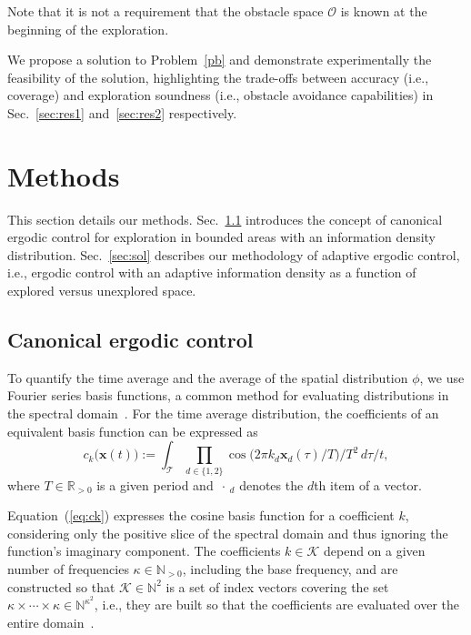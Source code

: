 \documentclass[letterpaper, 10 pt, conference, twoside]{IEEEtran}
\theoremstyle{definition}
\begin{document}
Note that it is not a requirement that the obstacle space $\mathcal{O}$ is known at the beginning of the exploration.

We propose a solution to Problem~\ref{pb} and demonstrate experimentally the feasibility of the solution, highlighting the trade-offs between accuracy (i.e., coverage) and exploration soundness (i.e., obstacle avoidance capabilities) in Sec.~\ref{sec:res1} and~\ref{sec:res2} respectively.


\section{Methods}\label{sec:meth}
\noindent
This section details our methods. Sec.~\ref{sec:canon} introduces the concept of canonical ergodic control for exploration in bounded areas with an information density distribution. Sec.~\ref{sec:sol} describes our methodology of adaptive ergodic control, i.e., ergodic control with an adaptive information density as a function of explored versus unexplored space.


\subsection{Canonical ergodic control}
\label{sec:canon}
\noindent
To quantify the time average and the average of the spatial distribution $\phi$, we use Fourier series basis functions, a common method for evaluating distributions in the spectral domain~\cite{mathew2011metrics}. For the time average distribution, the coefficients of an equivalent basis function can be expressed as
\begin{equation}\label{eq:ck}
  c_k\big(\mathbf{x}(t)\big):=\int_{\mathcal{T}}{\prod_{d\in\{1,2\}}}{\cos{\big(2\pi k_d\mathbf{x}_d(\tau)/T\big)}/T^2}\,d\tau/t,
\end{equation}
where $T\in\mathbb{R}_{>0}$ is a given period and $\,\cdot\,_d$ denotes the $d$th item of a vector.

Equation~(\ref{eq:ck}) expresses the cosine basis function for a coefficient $k$, considering only the positive slice of the spectral domain and thus ignoring the function's imaginary component. The coefficients $k\in\mathcal{K}$ depend on a given number of frequencies $\kappa\in\mathbb{N}_{>0}$, including the base frequency, and are constructed so that $\mathcal{K}\in\mathbb{N}^2$ is a set of index vectors covering the set $\kappa\times\cdots\times\kappa\in\mathbb{N}^{\kappa^2}$, i.e., they are built so that the coefficients are evaluated over the entire domain~\cite{calinon2020mixture}.
\end{document}
